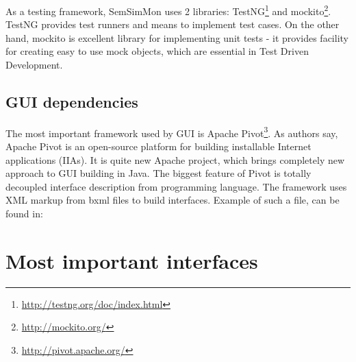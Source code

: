 As a testing framework, SemSimMon uses 2 libraries: TestNG\footnote{\url{http://testng.org/doc/index.html}} and
mockito\footnote{\url{http://mockito.org/}}. TestNG provides test runners and means to implement test cases. On the
other hand, mockito is excellent library for implementing unit tests - it provides facility for creating easy to use
mock objects, which are essential in Test Driven Development.

\subsection{GUI dependencies}

The most important framework used by GUI is Apache Pivot\footnote{\url{http://pivot.apache.org/}}. As authors say,
Apache Pivot is an open-source platform for building installable Internet applications (IIAs). It is quite new Apache
project, which brings completely new approach to GUI building in Java. The biggest feature of Pivot is totally
decoupled interface description from programming language. The framework uses XML markup from bxml files to build
interfaces. Example of such a file, can be found in:


\section{Most important interfaces}



